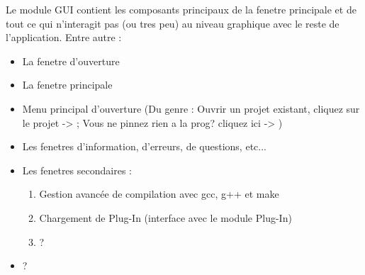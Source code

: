 \documentclass[a4paper,12pt]{article}
\begin{document}
Le module GUI contient les composants principaux de la fenetre principale et de tout ce qui n'interagit pas (ou tres peu) au niveau graphique avec le reste de l'application.
Entre autre :
\begin{itemize}
\item La fenetre d'ouverture
\item La fenetre principale
\item Menu principal d'ouverture (Du genre : Ouvrir un projet existant, cliquez sur le projet -> ; Vous ne pinnez rien a la prog? cliquez ici -> )
\item Les fenetres d'information, d'erreurs, de questions, etc...
\item Les fenetres secondaires :
\begin{enumerate}
\item Gestion avancée de compilation avec gcc, g++ et make
\item Chargement de Plug-In (interface avec le module Plug-In)
\item ?
\end{enumerate}
\item ?
\end{itemize}
\end{document}
